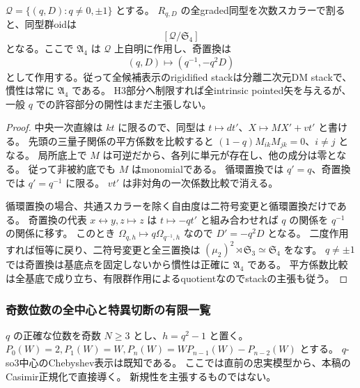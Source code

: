 \begin{proposition}[全候補pencilの幾何学的矢]
\label{prop:quantum-triangle-general-arrows}
$\mathcal Q=\{(q,D):q\ne0,\pm1\}$ とする。
$R_{q,D}$ の全graded同型を次数スカラーで割ると、同型群oidは
\[
 [\mathcal Q/\mathfrak S_4]
\]
となる。ここで $\mathfrak A_4$ は $\mathcal Q$ 上自明に作用し、奇置換は
\[
 (q,D)\longmapsto(q^{-1},-q^2D)
\]
として作用する。従って全候補表示のrigidified stackは分離二次元DM stackで、慣性は常に $\mathfrak A_4$ である。
H3部分へ制限すれば全intrinsic pointed矢を与えるが、一般 $q$ での許容部分の開性はまだ主張しない。
\end{proposition}
\begin{proof}
中央一次直線は $kt$ に限るので、同型は $t\mapsto dt'$、$X\mapsto MX'+vt'$ と書ける。
先頭の三量子関係の平方係数を比較すると
$(1-q)M_{ik}M_{jk}=0$、$i\ne j$ となる。
局所底上で $M$ は可逆だから、各列に単元が存在し、他の成分は零となる。
従って非被約底でも $M$ はmonomialである。
循環置換では $q'=q$、奇置換では $q'=q^{-1}$ に限る。
$vt'$ は非対角の一次係数比較で消える。

循環置換の場合、共通スカラーを除く自由度は二符号変更と循環置換だけである。
奇置換の代表 $x\leftrightarrow y,z\mapsto z$ は $t\mapsto-qt'$ と組み合わせれば
$q$ の関係を $q^{-1}$ の関係に移す。
このとき $\Omega_{q,h}\mapsto q\Omega_{q^{-1},h}$ なので
$D'=-q^2D$ となる。
二度作用すれば恒等に戻り、二符号変更と全三置換は
$(\mu_2)^2\rtimes\mathfrak S_3\simeq\mathfrak S_4$ をなす。
$q\ne\pm1$ では奇置換は基底点を固定しないから慣性は正確に $\mathfrak A_4$ である。
平方係数比較は全基底で成り立ち、有限群作用によるquotientなのでstackの主張も従う。
\end{proof}

\subsubsection{奇数位数の全中心と特異切断の有限一覧}
$q$ の正確な位数を奇数 $N\ge3$ とし、$h=q^2-1$ と置く。
$P_0(W)=2,P_1(W)=W,P_n(W)=WP_{n-1}(W)-P_{n-2}(W)$ とする。
$q$-so3中心のChebyshev表示は既知である\cite{HuangAWCentre}。
ここでは直前の忠実模型から、本稿のCasimir正規化で直接導く。
新規性を主張するものではない。

